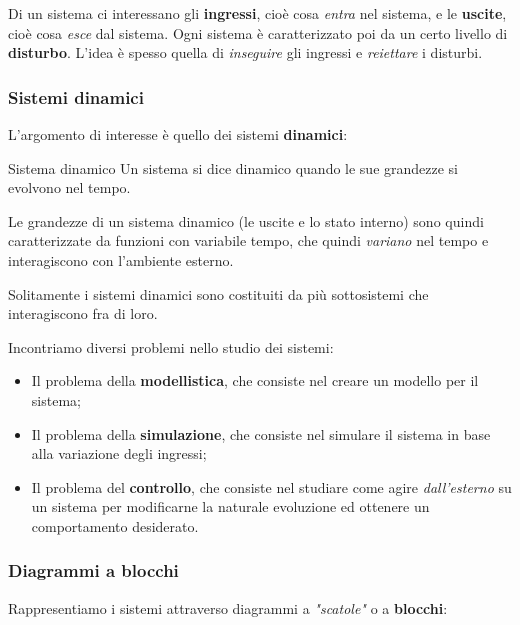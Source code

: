 \documentclass[a4paper,11pt]{article}
\begin{document}
Di un sistema ci interessano gli \textbf{ingressi}, cioè cosa \textit{entra} nel sistema, e le \textbf{uscite}, cioè cosa \textit{esce} dal sistema.
Ogni sistema è caratterizzato poi da un certo livello di \textbf{disturbo}.
L'idea è spesso quella di \textit{inseguire} gli ingressi e \textit{reiettare} i disturbi.

\subsubsection{Sistemi dinamici}
L'argomento di interesse è quello dei sistemi \textbf{dinamici}:
\begin{definition}{Sistema dinamico}
	Un sistema si dice dinamico quando le sue grandezze si evolvono nel tempo.
\end{definition}

Le grandezze di un sistema dinamico (le uscite e lo stato interno) sono quindi caratterizzate da funzioni con variabile tempo, che quindi \textit{variano} nel tempo e interagiscono con l'ambiente esterno.

Solitamente i sistemi dinamici sono costituiti da più sottosistemi che interagiscono fra di loro.

\par\medskip

Incontriamo diversi problemi nello studio dei sistemi:
\begin{itemize}
	\item Il problema della \textbf{modellistica}, che consiste nel creare un modello per il sistema;
	\item Il problema della \textbf{simulazione}, che consiste nel simulare il sistema in base alla variazione degli ingressi;
	\item Il problema del \textbf{controllo}, che consiste nel studiare come agire \textit{dall'esterno} su un sistema per modificarne la naturale evoluzione ed ottenere un comportamento desiderato.
\end{itemize}

\subsubsection{Diagrammi a blocchi}
Rappresentiamo i sistemi attraverso diagrammi a \textit{"scatole"} o a \textbf{blocchi}:

\begin{center}
\end{center} 
\end{document}
